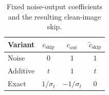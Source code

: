 \begin{table}[!htbp]
\centering
\caption{Fixed noise-output coefficients and the resulting clean-image skip.}
\label{tab:exp-coeff}
\small
\begin{tabular}{lccc}
\toprule
Variant & $c_{\mathrm{skip}}$ & $c_{\mathrm{out}}$ & $\tilde c_{\mathrm{skip}}$\\
\midrule
Noise & $0$ & $1$ & $1$\\
Additive & $t$ & $1$ & $t$\\
Exact & $1/\sigma_t$ & $-1/\sigma_t$ & $0$\\
\bottomrule
\end{tabular}
\end{table}
